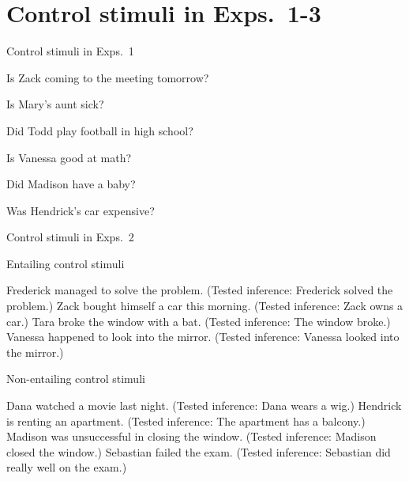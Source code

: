 \documentclass[11pt,fleqn]{article}
\newcommand{\6}{\mbox{$[\hspace*{-.6mm}[$}}
\newcommand{\9}{\mbox{$]\hspace*{-.6mm}]$}}
\begin{document}
\section{Control stimuli in Exps.~1-3}\label{a-control}

\begin{exe}
  Control stimuli in Exps.~1
\begin{xlist}

\ex   Is Zack coming to the meeting tomorrow?

\ex Is Mary's aunt sick?

\ex Did Todd play football in high school?

\ex Is Vanessa good at math?

\ex Did Madison have a baby?

\ex Was Hendrick's car expensive?

\end{xlist}
\end{exe}

\begin{exe}
 Control stimuli in Exps.~2
\begin{xlist}
\ex Entailing control stimuli
\begin{xlist}
 Frederick managed to solve the problem. (Tested inference: Frederick solved the problem.)
 Zack bought himself a car this morning. (Tested inference: Zack owns a car.)
 Tara broke the window with a bat. (Tested inference: The window broke.)
 Vanessa happened to look into the mirror. (Tested inference: Vanessa looked into the mirror.)
\end{xlist}
\ex Non-entailing control stimuli
\begin{xlist}
 Dana watched a movie last night. (Tested inference: Dana wears a wig.)
 Hendrick is renting an apartment. (Tested inference: The apartment has a balcony.)
 Madison was unsuccessful in closing the window. (Tested inference:  Madison closed the window.)
 Sebastian failed the exam. (Tested inference: Sebastian did really well on the exam.)
\end{xlist}
\end{xlist}
\end{exe}
\end{document}

